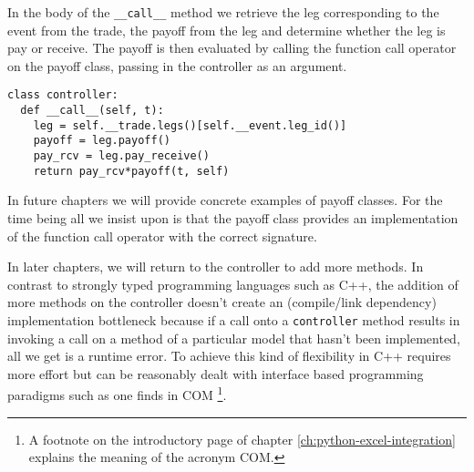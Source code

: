 In the body of the \verb|__call__| method we retrieve the leg corresponding to the
event from the trade, the payoff from the leg and determine whether
the leg is pay or receive. The payoff is then evaluated by calling the
function call operator on the payoff class, passing in the controller
as an argument.  
\begin{verbatim}
class controller:
  def __call__(self, t):
    leg = self.__trade.legs()[self.__event.leg_id()]
    payoff = leg.payoff()
    pay_rcv = leg.pay_receive()
    return pay_rcv*payoff(t, self)         
\end{verbatim}
In future chapters we will provide concrete examples
of payoff classes. For the time being all we insist upon is that
the payoff class provides an implementation of the function call
operator with the correct signature.

In later chapters, we will return to the controller to add more
methods. In contrast to strongly typed programming languages such as
C++, the addition of more methods on the controller doesn't create an
(compile/link dependency) implementation bottleneck because if a call
onto a \verb|controller| method results in invoking a call on a method
of a particular model that hasn't been implemented, all we get is a
runtime error. To achieve this kind of flexibility in C++ requires
more effort but can be reasonably dealt with interface based
programming paradigms such as one finds in COM \footnote{A footnote on
the introductory page of chapter \ref{ch:python-excel-integration}
explains the meaning of the acronym COM.}.

